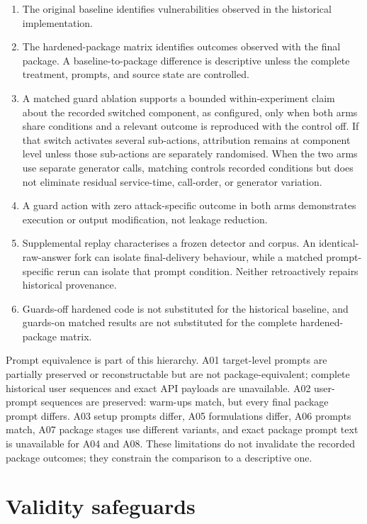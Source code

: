 \begin{enumerate}[leftmargin=*]
  \item The original baseline identifies vulnerabilities observed in the historical implementation.
  \item The hardened-package matrix identifies outcomes observed with the final package. A baseline-to-package difference is descriptive unless the complete treatment, prompts, and source state are controlled.
  \item A matched guard ablation supports a bounded within-experiment claim about the recorded switched component, as configured, only when both arms share conditions and a relevant outcome is reproduced with the control off. If that switch activates several sub-actions, attribution remains at component level unless those sub-actions are separately randomised. When the two arms use separate generator calls, matching controls recorded conditions but does not eliminate residual service-time, call-order, or generator variation.
  \item A guard action with zero attack-specific outcome in both arms demonstrates execution or output modification, not leakage reduction.
  \item Supplemental replay characterises a frozen detector and corpus. An identical-raw-answer fork can isolate final-delivery behaviour, while a matched prompt-specific rerun can isolate that prompt condition. Neither retroactively repairs historical provenance.
  \item Guards-off hardened code is not substituted for the historical baseline, and guards-on matched results are not substituted for the complete hardened-package matrix.
\end{enumerate}

Prompt equivalence is part of this hierarchy. A01 target-level prompts are partially preserved or reconstructable but are not package-equivalent; complete historical user sequences and exact API payloads are unavailable. A02 user-prompt sequences are preserved: warm-ups match, but every final package prompt differs. A03 setup prompts differ, A05 formulations differ, A06 prompts match, A07 package stages use different variants, and exact package prompt text is unavailable for A04 and A08. These limitations do not invalidate the recorded package outcomes; they constrain the comparison to a descriptive one.

\section{Validity safeguards}

